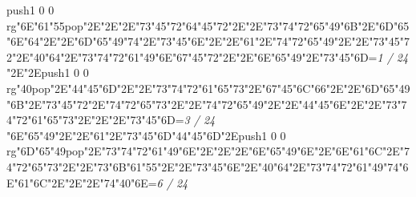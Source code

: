 \null\vfill\pdfcolorstack\match push{1 0 0 rg}\ipa\char"6E\ipa\char"61\ipa\char"55\pdfcolorstack\match pop{}\ipa\char"2E\quad\quad\quad\quad\ipa\char"2E\quad\ipa\char"2E\ipa\char"73\ipa\char"45\ipa\char"72\bigskip\ipa\char"64\ipa\char"45\ipa\char"72\ipa\char"2E\quad\quad\quad\ipa\char"2E\ipa\char"73\ipa\char"74\ipa\char"72\ipa\char"65\ipa\char"49\ipa\char"6B\bigskip\quad\quad\ipa\char"2E\ipa\char"6D\ipa\char"65\ipa\char"6E\ipa\char"64\ipa\char"2E\quad\ipa\char"2E\ipa\char"6D\ipa\char"65\ipa\char"49\ipa\char"74\ipa\char"2E\ipa\char"73\ipa\char"45\ipa\char"6E\ipa\char"2E\quad\quad\quad\quad\ipa\char"2E\quad\quad\quad\bigskip\ipa\char"61\ipa\char"2E\ipa\char"74\ipa\char"72\ipa\char"65\ipa\char"49\ipa\char"2E\quad\quad\ipa\char"2E\ipa\char"73\ipa\char"45\ipa\char"72\ipa\char"2E\ipa\char"40\ipa\char"64\ipa\char"2E\ipa\char"73\ipa\char"74\ipa\char"72\ipa\char"61\ipa\char"49\ipa\char"6E\bigskip\ipa\char"67\ipa\char"45\ipa\char"72\ipa\char"2E\quad\quad\ipa\char"2E\ipa\char"6E\ipa\char"65\ipa\char"49\ipa\char"2E\ipa\char"73\ipa\char"45\ipa\char"6D\bigskip\vfill\footline={\hfill\tenrm\it 1 / 24}\eject
\null\vfill\quad\quad\quad\ipa\char"2E\quad\quad\quad\quad\ipa\char"2E\pdfcolorstack\match push{1 0 0 rg}\ipa\char"40\pdfcolorstack\match pop{}\ipa\char"2E\ipa\char"44\ipa\char"45\ipa\char"6D\bigskip\quad\quad\quad\ipa\char"2E\quad\quad\quad\ipa\char"2E\ipa\char"73\ipa\char"74\ipa\char"72\ipa\char"61\ipa\char"65\ipa\char"73\bigskip\quad\quad\ipa\char"2E\ipa\char"67\ipa\char"45\ipa\char"6C\ipa\char"66\ipa\char"2E\quad\ipa\char"2E\ipa\char"6D\ipa\char"65\ipa\char"49\ipa\char"6B\ipa\char"2E\ipa\char"73\ipa\char"45\ipa\char"72\ipa\char"2E\ipa\char"74\ipa\char"72\ipa\char"65\ipa\char"73\ipa\char"2E\quad\quad\quad\bigskip\quad\ipa\char"2E\ipa\char"74\ipa\char"72\ipa\char"65\ipa\char"49\ipa\char"2E\quad\quad\ipa\char"2E\ipa\char"44\ipa\char"45\ipa\char"6E\ipa\char"2E\quad\quad\ipa\char"2E\ipa\char"73\ipa\char"74\ipa\char"72\ipa\char"61\ipa\char"65\ipa\char"73\bigskip\quad\quad\quad\ipa\char"2E\quad\quad\ipa\char"2E\quad\quad\quad\ipa\char"2E\ipa\char"73\ipa\char"45\ipa\char"6D\bigskip\vfill\footline={\hfill\tenrm\it 3 / 24}\eject
\null\vfill\ipa\char"6E\ipa\char"65\ipa\char"49\ipa\char"2E\quad\quad\quad\quad\ipa\char"2E\ipa\char"61\ipa\char"2E\ipa\char"73\ipa\char"45\ipa\char"6D\bigskip\ipa\char"44\ipa\char"45\ipa\char"6D\ipa\char"2E\pdfcolorstack\match push{1 0 0 rg}\ipa\char"6D\ipa\char"65\ipa\char"49\pdfcolorstack\match pop{}\ipa\char"2E\ipa\char"73\ipa\char"74\ipa\char"72\ipa\char"61\ipa\char"49\ipa\char"6E\bigskip\quad\quad\ipa\char"2E\quad\quad\quad\quad\ipa\char"2E\quad\ipa\char"2E\ipa\char"6E\ipa\char"65\ipa\char"49\ipa\char"6E\ipa\char"2E\ipa\char"6E\ipa\char"61\ipa\char"6C\ipa\char"2E\ipa\char"74\ipa\char"72\ipa\char"65\ipa\char"73\ipa\char"2E\quad\quad\quad\bigskip\quad\ipa\char"2E\ipa\char"73\ipa\char"6B\ipa\char"61\ipa\char"55\ipa\char"2E\quad\quad\ipa\char"2E\ipa\char"73\ipa\char"45\ipa\char"6E\ipa\char"2E\ipa\char"40\ipa\char"64\ipa\char"2E\ipa\char"73\ipa\char"74\ipa\char"72\ipa\char"61\ipa\char"49\ipa\char"74\bigskip\ipa\char"6E\ipa\char"61\ipa\char"6C\ipa\char"2E\quad\quad\ipa\char"2E\quad\quad\quad\ipa\char"2E\ipa\char"74\ipa\char"40\ipa\char"6E\bigskip\vfill\footline={\hfill\tenrm\it 6 / 24}\eject
